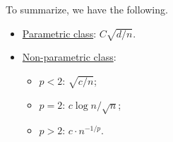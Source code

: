 \begin{remark}
	To summarize, we have the following.
	\begin{itemize}
		\item \hyperref[def:parametric]{Parametric class}: \(C \sqrt{d / n} \).
		\item \hyperref[def:non-parametric]{Non-parametric class}:
		      \begin{itemize}
			      \item \(p < 2\): \(\sqrt{c / n} \);
			      \item \(p = 2\): \(c \log n / \sqrt{n} \);
			      \item \(p > 2\): \(c\cdot n^{-1 / p}\).
		      \end{itemize}
	\end{itemize}
\end{remark}

